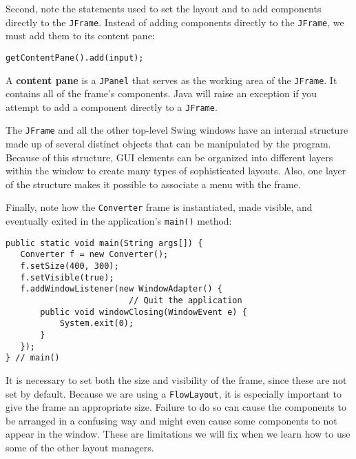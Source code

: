 Second, note the statements used to set the layout and to add
components directly to the {\tt JFrame}. Instead of adding components
directly to the {\tt JFrame}, we must add them to its content pane:

\begin{jjjlisting}
\begin{lstlisting}
getContentPane().add(input);
\end{lstlisting}
\end{jjjlisting}

\noindent A {\bf content pane} is a {\tt JPanel} that serves as the
working area of the {\tt JFrame}. It contains all of the frame's
components.  Java will raise an exception if you attempt to add a
component directly to a {\tt JFrame}.


\noindent The {\tt JFrame} and all the
other top-level Swing windows have an internal structure made up of
several distinct objects that can be manipulated by the
program.  Because of this structure, GUI elements can be organized into
different layers within the window to create many types of
sophisticated layouts.  Also, one layer of the structure makes it
possible to associate a menu with the frame.   

Finally, note how the {\tt Converter} frame is instantiated, made
visible, and eventually exited in the application's {\tt main()}
method:

\begin{jjjlisting}
\begin{lstlisting}
public static void main(String args[]) {
   Converter f = new Converter();
   f.setSize(400, 300);
   f.setVisible(true);
   f.addWindowListener(new WindowAdapter() {  
                         // Quit the application
       public void windowClosing(WindowEvent e) {
           System.exit(0);
       }
   });
} // main()
\end{lstlisting}
\end{jjjlisting}

\noindent It is necessary to set both the size and visibility of the
frame, since these are not set by default.  Because we are using a
{\tt FlowLayout}, it is especially important to give the frame an
appropriate size.   Failure to do so can cause the components to be
arranged in a confusing way and might even cause some components to not
appear in the window.  These are limitations we will fix when
we learn how to use some of the other layout managers.

